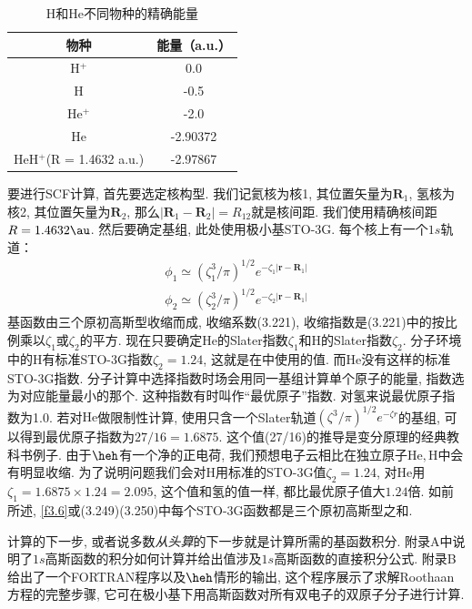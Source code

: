 \begin{table}[H]
	\centering
	\caption{H和He不同物种的精确能量}
	\begin{tabular}{cc}
		\hline
		物种 & 能量（a.u.）\\\hline
		H$^+$      & 0.0\\
		H     & -0.5\\
		He$^+$     & -2.0\\
		He     & -2.90372\\
		HeH$^+$(R = 1.4632 a.u.)&-2.97867\\\hline
	\end{tabular}
	\label{t3.4}
\end{table}
要进行SCF计算, 首先要选定核构型. 
我们记氦核为核1, 其位置矢量为$\mathbf{R}_1$, 
氢核为核2, 其位置矢量为$\mathbf{R}_2$, 
那么$|\mathbf{R}_1-\mathbf{R}_2|=R_{12}$就是核间距. 
我们使用精确核间距$R=1.4632\au$. 
然后要确定基组, 此处使用极小基STO-3G. 
每个核上有一个$1s$轨道：
\begin{align}
	\phi_1 \simeq (\zeta_1^3/\pi)^{1/2} e^{-\zeta_1|\mathbf{r-R}_1|}\\
	\phi_2 \simeq (\zeta_2^3/\pi)^{1/2} e^{-\zeta_2|\mathbf{r-R}_1|}
\end{align}
基函数由三个原初高斯型收缩而成, 
收缩系数(3.221), 
收缩指数是(3.221)中的按比例乘以$\zeta_1$或$\zeta_2$的平方. 
现在只要确定$\mathrm{He}$的Slater指数$\zeta_1$和$\mathrm{H}$的Slater指数$\zeta_2$. 
分子环境中的$\mathrm{H}$有标准STO-3G指数$\zeta_2=1.24$, 
这就是在中使用的值. 
而$\mathrm{He}$没有这样的标准STO-3G指数. 
分子计算中选择指数时场会用同一基组计算单个原子的能量, 
指数选为对应能量最小的那个. 
这种指数有时叫作``最优原子''指数. 
对氢来说最优原子指数为1.0. 
若对$\mathrm{He}$做限制性\hft 计算, 
使用只含一个Slater轨道$(\zeta^3/\pi)^{1/2}e^{-\zeta r}$的基组, 
可以得到最优原子指数为$27/16=1.6875$. 
这个值(27/16)的推导是变分原理的经典教科书例子.
由于$\heh$有一个净的正电荷, 
我们预想电子云相比在独立原子$\mathrm{He,H}$中会有明显收缩. 
为了说明问题我们会对$\mathrm{H}$用标准的STO-3G值$\zeta_2=1.24$, 
对$\mathrm{He}$用$\zeta_1=1.6875\times 1.24=2.095$, 
这个值和氢的值一样, 
都比最优原子值大$1.24$倍. 
如前所述, 
\autoref{f3.6}或(3.249)(3.250)中每个STO-3G函数都是三个原初高斯型之和.


计算的下一步, 
或者说多数\emph{从头算}的下一步就是计算所需的基函数积分. 
附录A中说明了$1s$高斯函数的积分如何计算并给出值涉及$1s$高斯函数的直接积分公式. 
附录B给出了一个FORTRAN程序以及$\heh$情形的输出, 
这个程序展示了求解Roothaan方程的完整步骤, 
它可在极小基下用高斯函数对所有双电子的双原子分子进行计算. 

